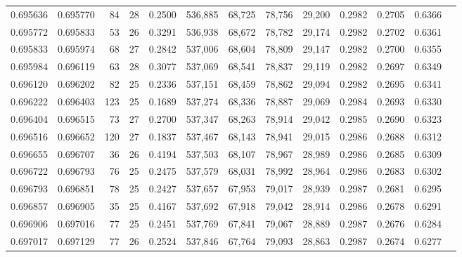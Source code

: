 \begin{tabular}{rrrrrrrrrrrrr}
0.695636 & 0.695770 &    84 &  28 &                                     0.2500 & 536,885 &  68,725 &  78,756 &  29,200 & 0.2982 & 0.2705 & 0.6366 \\
0.695772 & 0.695833 &    53 &  26 &                                     0.3291 & 536,938 &  68,672 &  78,782 &  29,174 & 0.2982 & 0.2702 & 0.6361 \\
0.695833 & 0.695974 &    68 &  27 &                                     0.2842 & 537,006 &  68,604 &  78,809 &  29,147 & 0.2982 & 0.2700 & 0.6355 \\
0.695984 & 0.696119 &    63 &  28 &                                     0.3077 & 537,069 &  68,541 &  78,837 &  29,119 & 0.2982 & 0.2697 & 0.6349 \\
0.696120 & 0.696202 &    82 &  25 &                                     0.2336 & 537,151 &  68,459 &  78,862 &  29,094 & 0.2982 & 0.2695 & 0.6341 \\
0.696222 & 0.696403 &   123 &  25 &                                     0.1689 & 537,274 &  68,336 &  78,887 &  29,069 & 0.2984 & 0.2693 & 0.6330 \\
0.696404 & 0.696515 &    73 &  27 &                                     0.2700 & 537,347 &  68,263 &  78,914 &  29,042 & 0.2985 & 0.2690 & 0.6323 \\
0.696516 & 0.696652 &   120 &  27 &                                     0.1837 & 537,467 &  68,143 &  78,941 &  29,015 & 0.2986 & 0.2688 & 0.6312 \\
0.696655 & 0.696707 &    36 &  26 &                                     0.4194 & 537,503 &  68,107 &  78,967 &  28,989 & 0.2986 & 0.2685 & 0.6309 \\
0.696722 & 0.696793 &    76 &  25 &                                     0.2475 & 537,579 &  68,031 &  78,992 &  28,964 & 0.2986 & 0.2683 & 0.6302 \\
0.696793 & 0.696851 &    78 &  25 &                                     0.2427 & 537,657 &  67,953 &  79,017 &  28,939 & 0.2987 & 0.2681 & 0.6295 \\
0.696857 & 0.696905 &    35 &  25 &                                     0.4167 & 537,692 &  67,918 &  79,042 &  28,914 & 0.2986 & 0.2678 & 0.6291 \\
0.696906 & 0.697016 &    77 &  25 &                                     0.2451 & 537,769 &  67,841 &  79,067 &  28,889 & 0.2987 & 0.2676 & 0.6284 \\
0.697017 & 0.697129 &    77 &  26 &                                     0.2524 & 537,846 &  67,764 &  79,093 &  28,863 & 0.2987 & 0.2674 & 0.6277 \\

\end{tabular}
